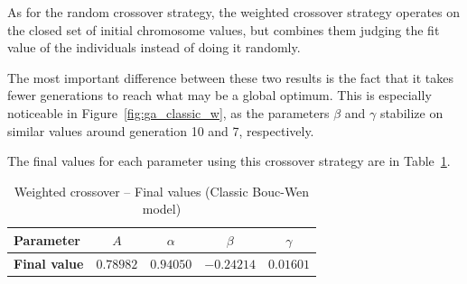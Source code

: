 As for the random crossover strategy, the weighted crossover strategy
operates on the closed set of initial chromosome values, but combines
them judging the fit value of the individuals instead of doing it randomly.

The most important difference between these two results is the fact that
it takes fewer generations to reach what may be a global optimum.
This is especially noticeable in Figure~\ref{fig:ga_classic_w},
as the parameters $\beta$ and $\gamma$ stabilize on similar values
around generation 10 and 7, respectively.

The final values for each parameter using this crossover strategy
are in Table~\ref{tab:ga_classic_weighted_final}.

\begin{table}[H]
	\centering
	\begin{tabular}{l c c c c}
		\toprule
		\textbf{Parameter}		& $A$	& $\alpha$	& $\beta$	& $\gamma$ 	\\ \midrule
		\textbf{Final value}	& $0.78982$	& $0.94050$	& $-0.24214$ & $0.01601$	\\ \bottomrule
	\end{tabular}
	\caption{Weighted crossover -- Final values (Classic Bouc-Wen model)}
	\label{tab:ga_classic_weighted_final}
\end{table}

